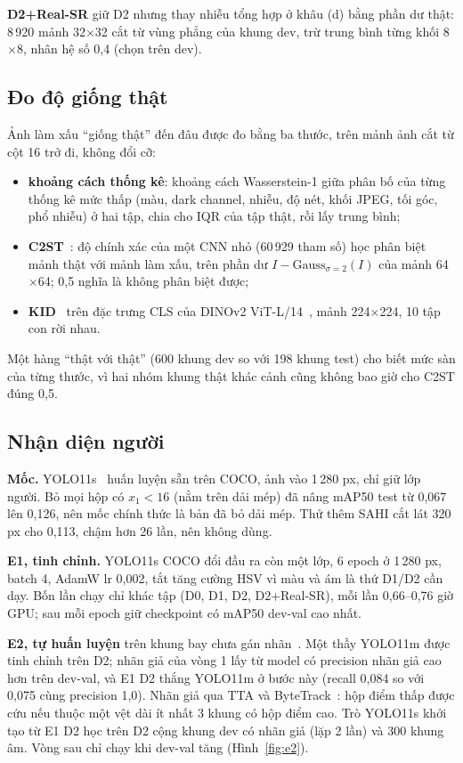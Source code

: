 \textbf{D2+Real-SR} giữ D2 nhưng thay nhiễu tổng hợp ở khâu (d) bằng phần dư thật: 8\,920 mảnh 32$\times$32 cắt từ vùng phẳng của khung dev, trừ trung bình từng khối 8$\times$8, nhân hệ số 0,4 (chọn trên dev).

\subsection{Đo độ giống thật}\label{sec:do-giong}

Ảnh làm xấu ``giống thật'' đến đâu được đo bằng ba thước, trên mảnh ảnh cắt từ cột 16 trở đi, không đổi cỡ:
\begin{itemize}
\item \textbf{khoảng cách thống kê}: khoảng cách Wasserstein-1 giữa phân bố của từng thống kê mức thấp (màu, dark channel, nhiễu, độ nét, khối JPEG, tối góc, phổ nhiễu) ở hai tập, chia cho IQR của tập thật, rồi lấy trung bình;
\item \textbf{C2ST}~\cite{c2st}: độ chính xác của một CNN nhỏ (60\,929 tham số) học phân biệt mảnh thật với mảnh làm xấu, trên phần dư $I - \mathrm{Gauss}_{\sigma=2}(I)$ của mảnh 64$\times$64; 0,5 nghĩa là không phân biệt được;
\item \textbf{KID}~\cite{kid} trên đặc trưng CLS của DINOv2 ViT-L/14~\cite{dinov2}, mảnh 224$\times$224, 10 tập con rời nhau.
\end{itemize}
Một hàng ``thật với thật'' (600 khung dev so với 198 khung test) cho biết mức sàn của từng thước, vì hai nhóm khung thật khác cảnh cũng không bao giờ cho C2ST đúng 0,5.

\subsection{Nhận diện người}

\textbf{Mốc.} YOLO11s~\cite{yolo11} huấn luyện sẵn trên COCO, ảnh vào 1\,280 px, chỉ giữ lớp người. Bỏ mọi hộp có $x_1 < 16$ (nằm trên dải mép) đã nâng mAP50 test từ 0,067 lên 0,126, nên mốc chính thức là bản đã bỏ dải mép. Thử thêm SAHI cắt lát 320 px cho 0,113, chậm hơn 26 lần, nên không dùng.

\textbf{E1, tinh chỉnh.} YOLO11s COCO đổi đầu ra còn một lớp, 6 epoch ở 1\,280 px, batch 4, AdamW lr 0,002, tắt tăng cường HSV vì màu và ám là thứ D1/D2 cần dạy. Bốn lần chạy chỉ khác tập (D0, D1, D2, D2+Real-SR), mỗi lần 0,66–0,76 giờ GPU; sau mỗi epoch giữ checkpoint có mAP50 dev-val cao nhất.

\textbf{E2, tự huấn luyện} trên khung bay chưa gán nhãn~\cite{selftrain}. Một thầy YOLO11m được tinh chỉnh trên D2; nhãn giả của vòng 1 lấy từ model có precision nhãn giả cao hơn trên dev-val, và E1 D2 thắng YOLO11m ở bước này (recall 0,084 so với 0,075 cùng precision 1,0). Nhãn giả qua TTA và ByteTrack~\cite{bytetrack}: hộp điểm thấp được cứu nếu thuộc một vệt dài ít nhất 3 khung có hộp điểm cao. Trò YOLO11s khởi tạo từ E1 D2 học trên D2 cộng khung dev có nhãn giả (lặp 2 lần) và 300 khung âm. Vòng sau chỉ chạy khi dev-val tăng (Hình~\ref{fig:e2}).

